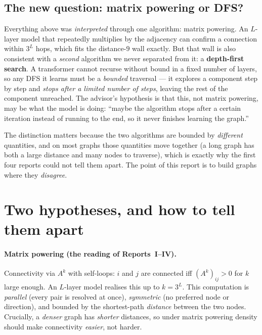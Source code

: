 \documentclass[11pt,a4paper]{article}
\begin{document}
\subsection{The new question: matrix powering or DFS?}
\label{sec:question}

Everything above was \emph{interpreted} through one algorithm: matrix powering. An $L$-layer
model that repeatedly multiplies by the adjacency can confirm a connection within $3^L$ hops,
which fits the distance-$9$ wall exactly. But that wall is also consistent with a \emph{second}
algorithm we never separated from it: a \textbf{depth-first search}. A transformer cannot
recurse without bound in a fixed number of layers, so any DFS it learns must be a
\emph{bounded} traversal --- it explores a component step by step and \emph{stops after a
limited number of steps}, leaving the rest of the component unreached. The advisor's hypothesis
is that this, not matrix powering, may be what the model is doing: ``maybe the algorithm stops
after a certain iteration instead of running to the end, so it never finishes learning the
graph.''

The distinction matters because the two algorithms are bounded by \emph{different} quantities,
and on most graphs those quantities move together (a long graph has both a large distance and
many nodes to traverse), which is exactly why the first four reports could not tell them apart.
The point of this report is to build graphs where they \emph{disagree}.

\section{Two hypotheses, and how to tell them apart}
\label{sec:hypotheses}

\paragraph{Matrix powering (the reading of Reports~I--IV).} Connectivity via $A^{k}$ with
self-loops: $i$ and $j$ are connected iff $(A^{k})_{ij}>0$ for $k$ large enough. An $L$-layer
model realises this up to $k=3^L$. This computation is \emph{parallel} (every pair is resolved
at once), \emph{symmetric} (no preferred node or direction), and bounded by the
shortest-path \emph{distance} between the two nodes. Crucially, a \emph{denser} graph has
\emph{shorter} distances, so under matrix powering density should make connectivity
\emph{easier}, not harder.
\end{document}
